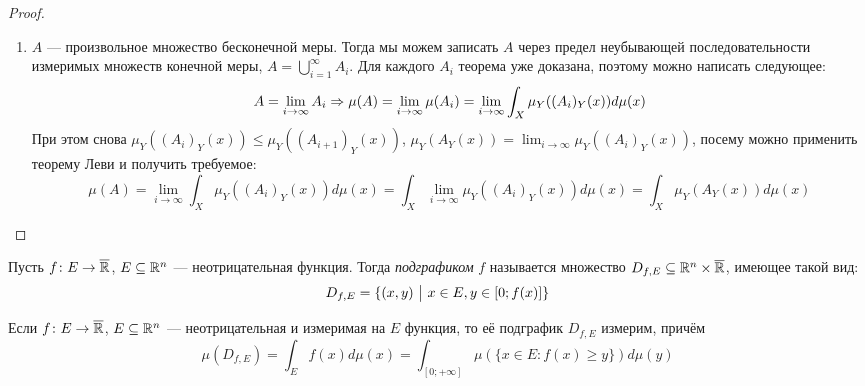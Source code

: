 \begin{proof}
\begin{enumerate}
		\item $A$ --- произвольное множество бесконечной меры. Тогда мы можем записать $A$ через предел неубывающей последовательности измеримых множеств конечной меры, $A = \bigcup_{i = 1}^\infty A_i$. Для каждого $A_i$ теорема уже доказана, поэтому можно написать следующее:
		\[
			A = \lim_{i \to \infty} A_i \Rightarrow \mu(A) = \lim_{i \to \infty} \mu(A_i) = \lim_{i \to \infty} \int_X \mu_Y((A_i)_Y(x))d\mu(x)
		\]
		При этом снова $\mu_Y((A_i)_Y(x)) \le \mu_Y((A_{i + 1})_Y(x))$, $\mu_Y(A_Y(x)) = \lim_{i \to \infty} \mu_Y((A_i)_Y(x))$, посему можно применить теорему Леви и получить требуемое:
		\[
			\mu(A) = \lim_{i \to \infty} \int_X \mu_Y((A_i)_Y(x))d\mu(x) = \int_X \lim_{i \to \infty} \mu_Y((A_i)_Y(x))d\mu(x) = \int_X \mu_Y(A_Y(x))d\mu(x)
		\]
	\end{enumerate}
\end{proof}

\begin{definition}
	Пусть $f \colon E \to \overline{\mathbb{R}}$, $E \subseteq \mathbb{R}^n$ --- неотрицательная функция. Тогда \textit{подграфиком} $f$ называется множество $D_{f, E} \subseteq \mathbb{R}^n \times \overline{\mathbb{R}}$, имеющее такой вид:
	\[
		D_{f, E} = \{(x, y) \ \big|\  x \in E, y \in [0; f(x)]\}
	\]
\end{definition}

\begin{lemma}
	Если $f \colon E \to \overline{\mathbb{R}}$, $E \subseteq \mathbb{R}^n$ --- неотрицательная и измеримая на $E$ функция, то её подграфик $D_{f, E}$ измерим, причём
	\[
		\mu(D_{f, E}) = \int_E f(x)d\mu(x) = \int_{[0; +\infty]} \mu(\{x \in E \colon f(x) \ge y\})d\mu(y)
	\]
\end{lemma}

